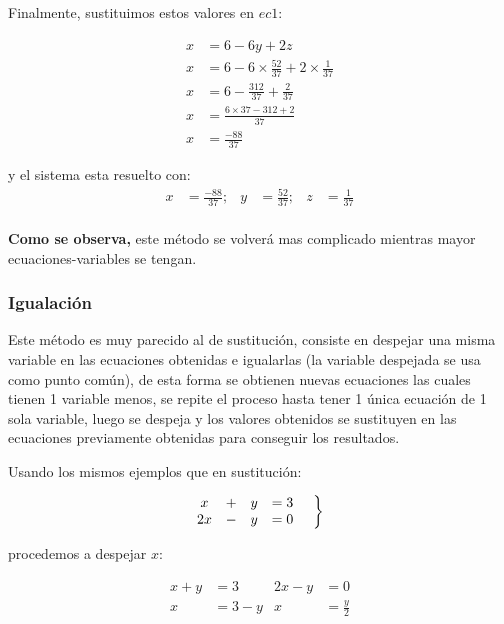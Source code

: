     Finalmente, sustituimos estos valores en $ ec1$:

    \begin{align*}
        x&= 6-6y+2z	\\
        x &= 6- 6\times \frac{52}{37} + 2\times \frac{1}{37}\\
        x&= 6- \frac{312}{37} + \frac{2}{37} \\
        x &= \frac{6\times37 - 312 + 2}{37}\\
        x &=\frac{-88}{37}
    \end{align*}

    y el sistema esta resuelto con:
    \begin{align*}
        x &=\frac{-88}{37} ;& y&=\frac{52}{37} ;& z&=\frac{1}{37}  		\\
    \end{align*}


    \textbf{Como se observa,} este método se volverá mas complicado mientras mayor
    ecuaciones-variables se tengan.

    \subsubsection*{Igualación} \label{Igualacion}

    Este método es muy parecido al de sustitución, consiste en despejar una misma
    variable en las ecuaciones obtenidas e igualarlas (la variable despejada se
    usa como punto común), de esta forma se obtienen
    nuevas ecuaciones las cuales tienen 1 variable menos, se repite el proceso
    hasta tener 1 única ecuación de 1 sola variable, luego se despeja y los valores
    obtenidos se sustituyen en las ecuaciones previamente obtenidas para conseguir
    los resultados.

    Usando los mismos ejemplos que en sustitución:


    \begin{equation*}
        \left.
        \begin{matrix}
            x &+& y &=3\\
            2x &-& y &=0
        \end{matrix}
        \hspace*{0.5cm}\right\rbrace
    \end{equation*}

   procedemos a despejar $x$:

    \begin{align*}
        x+y &=3     & 2x-y&=0 		\\
        x&=3-y      & x&= \frac{y}{2}
    \end{align*}

